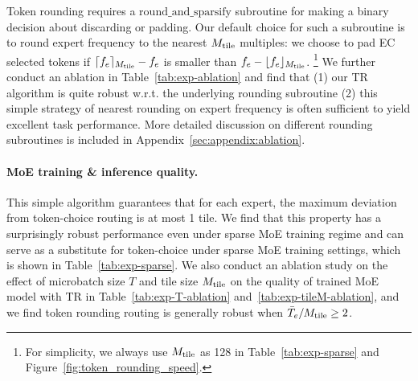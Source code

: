 
Token rounding requires a $\mathrm{round\_and\_sparsify}$ subroutine for making a binary decision about discarding or padding. Our default choice for such a subroutine is to round expert frequency to the nearest $M_\mathrm{tile}$ multiples: we choose to pad EC selected tokens if $\lceil f_e\rceil_{M_\mathrm{tile}} - f_e$ is smaller than $f_e - \lfloor f_e\rfloor_{M_\mathrm{tile}}$. \footnote{For simplicity, we always use $M_\mathrm{tile}$ as 128 in Table~\ref{tab:exp-sparse} and Figure~\ref{fig:token_rounding_speed}.} We further conduct an ablation in Table~\ref{tab:exp-ablation} and find that (1) our TR algorithm is quite robust w.r.t. the underlying rounding subroutine (2) this simple strategy of nearest rounding on expert frequency is often sufficient to yield excellent task performance. More detailed discussion on different rounding subroutines is included in Appendix~\ref{sec:appendix:ablation}.


\paragraph{MoE training \& inference quality.}

This simple algorithm guarantees that for each expert, the maximum deviation from token-choice routing is at most 1 tile. We find that this property has a surprisingly robust performance even under sparse MoE training regime and can serve as a substitute for token-choice under sparse MoE training settings, which is shown in Table~\ref{tab:exp-sparse}. We also conduct an ablation study on the effect of microbatch size $T$ and tile size $M_\mathrm{tile}$ on the quality of trained MoE model with TR in Table~\ref{tab:exp-T-ablation} and~\ref{tab:exp-tileM-ablation}, and we find token rounding routing is generally robust when $\bar{T}_e/M_\mathrm{tile} \geq 2$.









